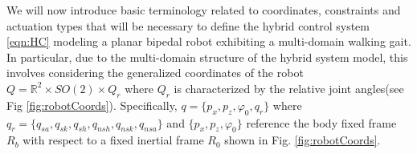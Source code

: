 We will now introduce basic terminology related to coordinates, constraints and actuation types that will be necessary to define the hybrid control system \eqref{eqn:HC} modeling a planar bipedal robot exhibiting a multi-domain walking gait. In particular, due to the multi-domain structure of the hybrid system model, this involves considering the generalized coordinates of the robot $Q = \mathbb{R}^{2} \times SO(2) \times Q_{r}$ where $Q_{r}$ is characterized by the relative joint angles(see Fig \ref{fig:robotCoords}). Specifically, $q = \{p_{x},p_{z},\varphi_{0},q_{r}\}$ where $q_{r} = \{q_{sa},q_{sk},q_{sh},q_{nsh},q_{nsk},q_{nsa}\}$ and $\{p_{x},p_{z},\varphi_{0}\}$ reference the body fixed frame $R_{b}$ with respect to a fixed inertial frame $R_{0}$ shown in Fig. \ref{fig:robotCoords}.





